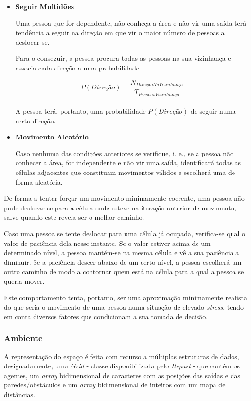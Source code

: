 \documentclass[12pt]{article}
\begin{document}
\begin{titlepage}
\begin{itemize}
\begin{itemize}
\item \textbf{Seguir Multidões}

Uma pessoa que for dependente, não conheça a área e não vir uma saída terá tendência a seguir na direção em que vir o maior número de pessoas a deslocar-se.

Para o conseguir, a pessoa procura todas as pessoas na sua vizinhança e associa cada direção a uma probabilidade.

\[P(Direção) = \frac{N_{DireçãoNaVizinhança}}{T_{PessoasVizinhança}}\]\\

A pessoa terá, portanto, uma probabilidade \(P(Direção)\) de seguir numa certa direção.

\item \textbf{Movimento Aleatório}

Caso nenhuma das condições anteriores se verifique, i. e., se a pessoa não conhecer a área, for independente e não vir uma saída, identificará todas as células adjacentes que constituam movimentos válidos e escolherá uma de forma aleatória. 

\end{itemize}

De forma a tentar forçar um movimento minimamente coerente, uma pessoa não pode deslocar-se para a célula onde esteve na iteração anterior de movimento, salvo quando este revela ser o melhor caminho.

Caso uma pessoa se tente deslocar para uma célula já ocupada, verifica-se qual o valor de paciência dela nesse instante. Se o valor estiver acima de um determinado nível, a pessoa mantém-se na mesma célula e vê a sua paciência a diminuir. Se a paciência descer abaixo de um certo nível, a pessoa escolherá um outro caminho de modo a contornar quem está na célula para a qual a pessoa se queria mover.

Este comportamento tenta, portanto, ser uma aproximação minimamente realista do que seria o movimento de uma pessoa numa situação de elevado \textit{stress}, tendo em conta diversos fatores que condicionam a sua tomada de decisão.


\subsubsection{Ambiente}
A representação do espaço é feita com recurso a múltiplas estruturas de dados, designadamente, uma \textit{Grid} - classe disponibilizada pelo \textit{Repast} - que contém os agentes, um \textit{array} bidimensional de caracteres com as posições das saídas e das paredes/obstáculos e um \textit{array} bidimensional de inteiros com um mapa de distâncias. 


\end{itemize}
\end{titlepage}
\end{document}
